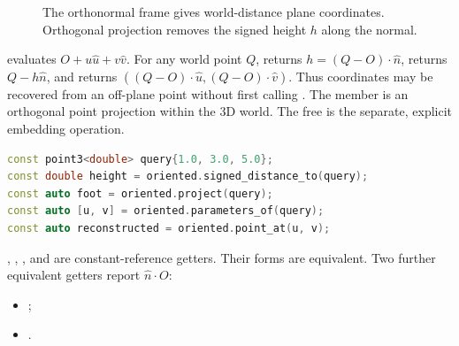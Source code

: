 \begin{figure}[htbp]
\centering
{}
\caption{The orthonormal frame gives world-distance plane coordinates.
Orthogonal projection removes the signed height $h$ along the normal.}
\label{fig:plane-frame}
\end{figure}

 evaluates $O+u\widehat u+v\widehat v$.
For any world point $Q$,  returns
$h=(Q-O)\cdot\widehat n$,  returns
$Q-h\widehat n$, and  returns
$((Q-O)\cdot\widehat u,(Q-O)\cdot\widehat v)$. Thus coordinates may be
recovered from an off-plane point without first calling .
The member  is an orthogonal point projection within
the 3D world. The free  is the separate,
explicit embedding operation.

\begin{lstlisting}[language=C++]
const point3<double> query{1.0, 3.0, 5.0};
const double height = oriented.signed_distance_to(query);
const auto foot = oriented.project(query);
const auto [u, v] = oriented.parameters_of(query);
const auto reconstructed = oriented.point_at(u, v);
\end{lstlisting}

, , , and
 are constant-reference getters. Their
 forms are equivalent. Two further equivalent getters report
$\widehat n\cdot O$:
\begin{itemize}[leftmargin=*]
\item {};
\item {}.
\end{itemize}

